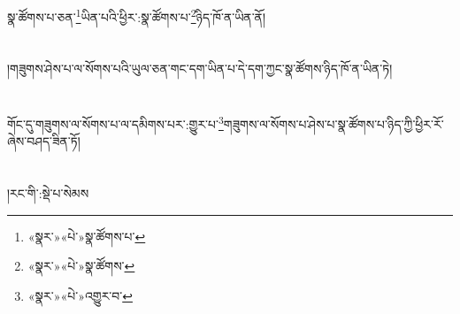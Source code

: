 སྣ་ཚོགས་པ་ཅན་\footnote{«སྣར་»«པེ་»སྣ་ཚོགས་པ་}ཡིན་པའི་ཕྱིར་:སྣ་ཚོགས་པ་\footnote{«སྣར་»«པེ་»སྣ་ཚོགས་}ཉིད་ཁོ་ན་ཡིན་ནོ།\chapter{ }།གཟུགས་ཤེས་པ་ལ་སོགས་པའི་ཡུལ་ཅན་གང་དག་ཡིན་པ་དེ་དག་ཀྱང་སྣ་ཚོགས་ཉིད་ཁོ་ན་ཡིན་ཏེ།\chapter{ }གོང་དུ་གཟུགས་ལ་སོགས་པ་ལ་དམིགས་པར་:གྱུར་པ་\footnote{«སྣར་»«པེ་»འགྱུར་བ་}གཟུགས་ལ་སོགས་པ་ཤེས་པ་སྣ་ཚོགས་པ་ཉིད་ཀྱི་ཕྱིར་རོ་ཞེས་བཤད་ཟིན་ཏོ།\chapter{ }།རང་གི་:སྡེ་པ་སེམས